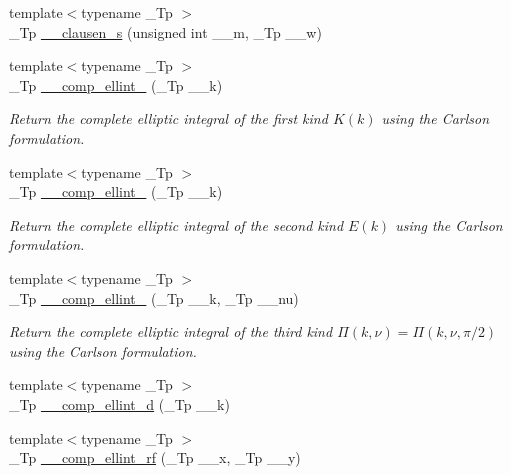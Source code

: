 \begin{DoxyCompactItemize}
\item 
{\footnotesize template$<$typename \+\_\+\+Tp $>$ }\\\+\_\+\+Tp \hyperlink{namespacestd_1_1____detail_a1b8a79cb99cbbe5ebbbc16a1dfa7d2c1}{\+\_\+\+\_\+clausen\+\_\+s} (unsigned int \+\_\+\+\_\+m, \+\_\+\+Tp \+\_\+\+\_\+w)
\item 
{\footnotesize template$<$typename \+\_\+\+Tp $>$ }\\\+\_\+\+Tp \hyperlink{namespacestd_1_1____detail_a7b23bcf7e9f20b1e353a047126e13af1}{\+\_\+\+\_\+comp\+\_\+ellint\+\_} (\+\_\+\+Tp \+\_\+\+\_\+k)
\begin{DoxyCompactList}\small\item\em Return the complete elliptic integral of the first kind $ K(k) $ using the Carlson formulation. \end{DoxyCompactList}\item 
{\footnotesize template$<$typename \+\_\+\+Tp $>$ }\\\+\_\+\+Tp \hyperlink{namespacestd_1_1____detail_a4836f4db24abd037705100750f82d375}{\+\_\+\+\_\+comp\+\_\+ellint\+\_} (\+\_\+\+Tp \+\_\+\+\_\+k)
\begin{DoxyCompactList}\small\item\em Return the complete elliptic integral of the second kind $ E(k) $ using the Carlson formulation. \end{DoxyCompactList}\item 
{\footnotesize template$<$typename \+\_\+\+Tp $>$ }\\\+\_\+\+Tp \hyperlink{namespacestd_1_1____detail_a26b35b5d72366d30ac4644db8f2f8be4}{\+\_\+\+\_\+comp\+\_\+ellint\+\_} (\+\_\+\+Tp \+\_\+\+\_\+k, \+\_\+\+Tp \+\_\+\+\_\+nu)
\begin{DoxyCompactList}\small\item\em Return the complete elliptic integral of the third kind $ \Pi(k,\nu) = \Pi(k,\nu,\pi/2) $ using the Carlson formulation. \end{DoxyCompactList}\item 
{\footnotesize template$<$typename \+\_\+\+Tp $>$ }\\\+\_\+\+Tp \hyperlink{namespacestd_1_1____detail_add5220a1ab03915e4a45dc547bb8eef6}{\+\_\+\+\_\+comp\+\_\+ellint\+\_\+d} (\+\_\+\+Tp \+\_\+\+\_\+k)
\item 
{\footnotesize template$<$typename \+\_\+\+Tp $>$ }\\\+\_\+\+Tp \hyperlink{namespacestd_1_1____detail_a41ecec8820344d3575b464ecd4db5171}{\+\_\+\+\_\+comp\+\_\+ellint\+\_\+rf} (\+\_\+\+Tp \+\_\+\+\_\+x, \+\_\+\+Tp \+\_\+\+\_\+y)

\end{DoxyCompactItemize}

